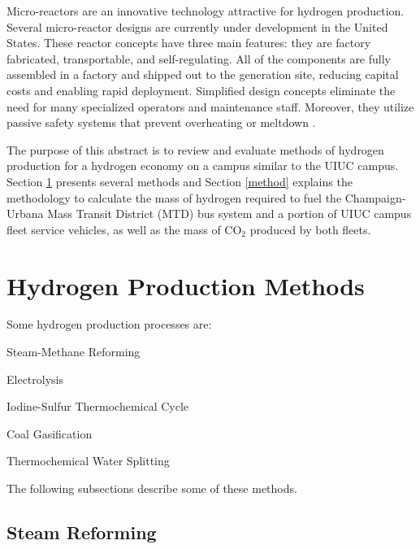\documentclass{anstrans}
\begin{document}
Micro-reactors are an innovative technology attractive for hydrogen production. Several micro-reactor designs are currently under development in the United States. These reactor concepts have three main features: they are factory fabricated, transportable, and self-regulating. All of the components are fully assembled in a factory and shipped out to the generation site, reducing capital costs and enabling rapid deployment. Simplified design concepts eliminate the need for many specialized operators and maintenance staff. Moreover, they utilize passive safety systems that prevent overheating or meltdown \cite{us-doe_ultimate_2019}.

The purpose of this abstract is to review and evaluate methods of hydrogen production for a hydrogen economy on a campus similar to the UIUC campus.
Section \ref{section:hydroprod} presents several methods and Section \ref{method} explains the methodology to calculate the mass of hydrogen required to fuel the Champaign-Urbana Mass Transit District (MTD) bus system and a portion of UIUC campus fleet service vehicles, as well as the mass of CO$_2$ produced by both fleets.

\section{Hydrogen Production Methods}
\label{section:hydroprod}

Some hydrogen production processes are: 
\begin{description}[font=$\bullet$\scshape\bfseries]
	\item[] Steam-Methane Reforming \cite{doe_office_of_energy_efficiency_and_renewable_energy_hydrogen_2020}
	\item[] Electrolysis \cite{doe_office_of_energy_efficiency_and_renewable_energy_hydrogen_2020}
	\item[] Iodine-Sulfur Thermochemical Cycle \cite{cea_gas-cooled_2006}
	\item[] Coal Gasification \cite{office_of_energy_efficiency_and_renewable_energy_coal_gas_2020}
	\item[] Thermochemical Water Splitting \cite{office_of_energy_efficiency_and_renewable_energy_thermo_water_2020}
\end{description}

The following subsections describe some of these methods.

\subsection{Steam Reforming}
\end{document}
